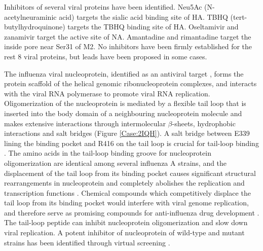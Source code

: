 Inhibitors of several viral proteins have been identified. Neu5Ac (N-acetylneuraminic acid) targets the sialic acid binding site of HA. TBHQ (tert-butylhydroquinone) targets the TBHQ binding site of HA. Oseltamivir and zanamivir target the active site of NA. Amantadine and rimantadine target the inside pore near Ser31 of M2. No inhibitors have been firmly established for the rest 8 viral proteins, but leads have been proposed in some cases.

The influenza viral nucleoprotein, identified as an antiviral target \citep{906}, forms the protein scaffold of the helical genomic ribonucleoprotein complexes, and interacts with the viral RNA polymerase to promote viral RNA replication. Oligomerization of the nucleoprotein is mediated by a flexible tail loop that is inserted into the body domain of a neighbouring nucleoprotein molecule and makes extensive interactions through intermolecular $\beta$-sheets, hydrophobic interactions and salt bridges \citep{1140} (Figure \ref{Case:2IQH}). A salt bridge between E339 lining the binding pocket and R416 on the tail loop is crucial for tail-loop binding \citep{1232,1233}. The amino acids in the tail-loop binding groove for nucleoprotein oligomerization are identical among several influenza A strains, and the displacement of the tail loop from its binding pocket causes significant structural rearrangements in nucleoprotein and completely abolishes the replication and transcription functions \citep{1231}. Chemical compounds which competitively displace the tail loop from its binding pocket would interfere with viral genome replication, and therefore serve as promising compounds for anti-influenza drug development \citep{1140}. The tail-loop peptide can inhibit nucleoprotein oligomerization and slow down viral replication. A potent inhibitor of nucleoprotein of wild-type and mutant strains has been identified through virtual screening \citep{1233}.

